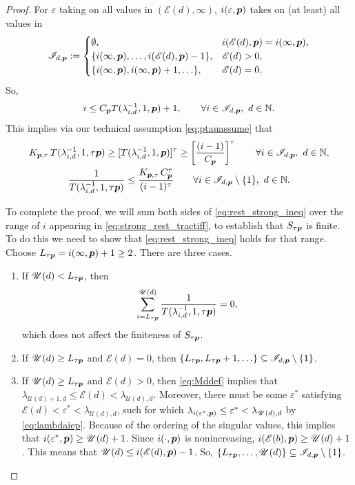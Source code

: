 \documentclass[sort&compress]{elsarticle}
\newcommand{\theM}{\mathscr{E}}
\newcommand{\theUB}{\mathscr{U}}
\begin{document}
\begin{proof}
For $\varepsilon$ taking on all values in $(\theM(d),\infty)$, $i(\varepsilon,\boldsymbol{p})$ takes on (at least) all values in
\[
\mathscr{I}_{d,\vp}:=\begin{cases}
\emptyset, & i(\theM(d),\vp) = i(\infty,\vp), \\
\{i(\infty,\vp),\ldots, i(\theM(d),\vp)-1\}, & \theM(d) > 0, \\
\{i(\infty,\vp), i(\infty,\vp) + 1, \ldots\}, & \theM(d) = 0.
\end{cases}
\]
So,
\[
i\le  C_{\boldsymbol{p}} T(\lambda_{i,d}^{-1},1,\boldsymbol{p})+1, \qquad \forall i\in \mathscr{I}_{d,\boldsymbol{p}},  \ d \in \mathbb{N}.
\]
This implies via our technical assumption \eqref{eq:ptauassume} that
\begin{gather}
\nonumber
 K_{\boldsymbol{p},\tau}\,T (\lambda_{i,d}^{-1},1,\tau \boldsymbol{p}) \ge
 [T(\lambda_{i,d}^{-1},1, \boldsymbol{p})]^\tau
 \ge
  \left[\frac{(i-1)}{C_{\boldsymbol{p}}}\right]^\tau \qquad \forall i\in \mathscr{I}_{d,\boldsymbol{p}},  \ d \in \mathbb{N}, \\
  \label{eq:rest_strong_ineq}
 \frac{1}{T (\lambda_{i,d}^{-1},1,\tau \boldsymbol{p})} \le
\frac{K_{\boldsymbol{p},\tau}\, C_{\boldsymbol{p}}^\tau}{(i-1)^\tau}\qquad \forall i \in \mathscr{I}_{d,\boldsymbol{p}} \setminus\{1\}, \ d \in \mathbb{N} .
\end{gather}


To complete the proof, we will sum both sides of \eqref{eq:rest_strong_ineq} over the range of $i$ appearing in \eqref{eq:strong_rest_tractiff}, to establish that $S_{\tau\boldsymbol{p}}$ is finite.  To do this we need to show that \eqref{eq:rest_strong_ineq} holds for that range.  Choose $L_{\tau\boldsymbol{p}} = i(\infty,\boldsymbol{p}) +1 \ge 2$. There are three cases.
\begin{enumerate}
\renewcommand{\labelenumi}{\roman{enumi})}


\item If $\theUB(d) < L_{\tau\vp}$, then
\[
\sum_{i = L_{\tau\vp}}^{\theUB(d)} \frac{1}{T (\lambda_{i,d}^{-1},1, \tau \vp)} = 0,
\]
which does not affect the finiteness of $S_{\tau\boldsymbol{p}}$.

\item If $\theUB(d) \ge L_{\tau\vp}$ and $\theM(d) = 0$, then $\{L_{\tau\boldsymbol{p}},  L_{\tau\boldsymbol{p}} + 1, \ldots \} \subseteq \mathscr{I}_{d,\boldsymbol{p}} \setminus \{1\}$.

\item If $\theUB(d) \ge L_{\tau\vp}$ and $\theM(d) >0$, then \eqref{eq:Mddef} implies that $\lambda_{\theUB(d)+1,d} \le \theM(d) < \lambda_{\theUB(d),d}$.  Moreover, there must be some $\varepsilon^*$ satisfying $\theM(d) < \varepsilon^* < \lambda_{\theUB(d),d}$, such for which $\lambda_{i(\varepsilon^*,\vp)} \le \varepsilon^* < \lambda_{\theUB(d),d}$ by \eqref{eq:lambdaiep}.  Because of the ordering of the singular values, this implies that  $i(\varepsilon^*,\vp) \ge \theUB(d)+1$.  Since $i(\cdot,\boldsymbol{p})$ is nonincreasing, $i(\theM(b),\vp) \ge \theUB(d)+1$.
This means that $\theUB(d) \le i(\theM(d),\vp)-1$.  So, $\{L_{\tau\vp}, \ldots, \theUB(d)\} \subseteq \mathscr{I}_{d,\vp} \setminus \{1\}$.


\end{enumerate}
\end{proof}
\end{document}
